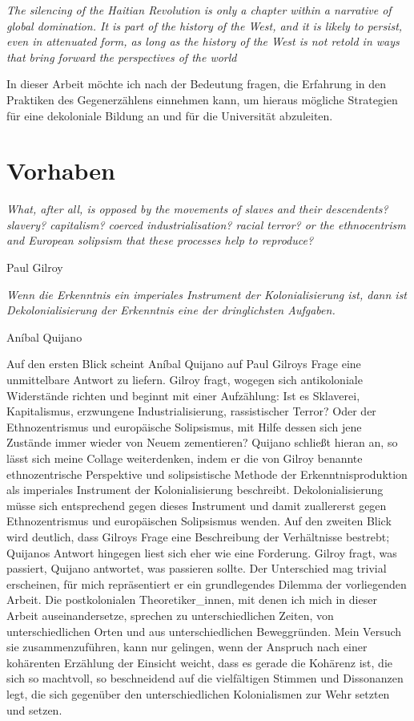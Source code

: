 \documentclass[11pt]{article}
\newenvironment{myenv}{\begin{adjustwidth}{2cm}{}}{\end{adjustwidth}}
\begin{document}
\begin{myenv}

  \textit{ \glqq The silencing of the Haitian Revolution is only a chapter within
    a narrative of global domination. It is part of the history of the West, and
    it is likely to persist, even in attenuated form, as long as the history of
    the West is not retold in ways that bring forward the perspectives of the
world \grqq \footnotemark {} } \end{myenv}

In dieser Arbeit möchte ich nach der Bedeutung fragen, die Erfahrung in den
Praktiken des Gegenerzählens einnehmen kann, um hieraus mögliche Strategien
für eine dekoloniale Bildung an und für die Universität abzuleiten.
\section{Vorhaben}
\epigraph{\textit{What, after all, is opposed by the movements of slaves and their descendents?
slavery? capitalism? coerced industrialisation? racial terror?
or the ethnocentrism and European solipsism that these processes help to
reproduce?}}{Paul Gilroy \footnotemark} 

\epigraph{\textit{Wenn die Erkenntnis ein imperiales Instrument der
Kolonialisierung ist, dann ist Dekolonialisierung der Erkenntnis eine der
dringlichsten Aufgaben.}}{Aníbal Quijano \footnotemark} 
Auf den ersten Blick scheint Aníbal Quijano auf Paul Gilroys Frage eine
unmittelbare Antwort zu liefern. Gilroy fragt, wogegen sich antikoloniale
Widerstände richten und beginnt mit einer Aufzählung: Ist es Sklaverei,
Kapitalismus, erzwungene Industrialisierung, rassistischer Terror? Oder der
Ethnozentrismus und europäische Solipsismus, mit Hilfe dessen sich jene Zustände
immer wieder von Neuem zementieren? Quijano schließt hieran an, so lässt sich
meine Collage weiterdenken, indem er die von Gilroy benannte ethnozentrische
Perspektive und solipsistische Methode der Erkenntnisproduktion als imperiales
Instrument der Kolonialisierung beschreibt. Dekolonialisierung müsse sich
entsprechend gegen dieses Instrument und damit zuallererst gegen Ethnozentrismus
und europäischen Solipsismus wenden.  Auf den zweiten Blick wird deutlich, dass
Gilroys Frage eine Beschreibung der Verhältnisse bestrebt; Quijanos Antwort
hingegen liest sich eher wie eine Forderung. Gilroy fragt, was passiert, Quijano
antwortet, was passieren sollte.  Der Unterschied mag trivial erscheinen, für
mich repräsentiert er ein grundlegendes Dilemma der vorliegenden Arbeit. Die
postkolonialen Theoretiker\_innen, mit denen ich mich in dieser Arbeit
auseinandersetze, sprechen zu unterschiedlichen Zeiten, von unterschiedlichen
Orten und aus unterschiedlichen Beweggründen. Mein Versuch sie zusammenzuführen,
kann nur gelingen, wenn der Anspruch nach einer kohärenten Erzählung der
Einsicht weicht, dass es gerade die Kohärenz ist, die sich so machtvoll, so
beschneidend auf die vielfältigen Stimmen und Dissonanzen legt, die sich
gegenüber den unterschiedlichen Kolonialismen zur Wehr setzten und setzen.
\end{document}
